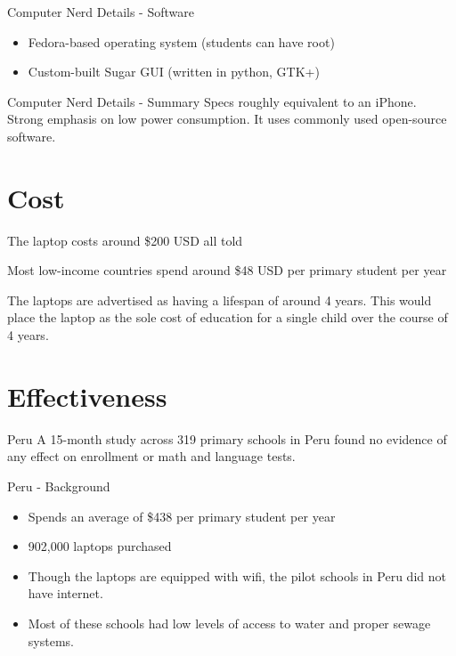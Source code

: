 \documentclass{beamer}
\begin{document}
\begin{frame}{Computer Nerd Details - Software}
\begin{itemize}
\item Fedora-based operating system (students can have root)
\item Custom-built Sugar GUI (written in python, GTK+) \cite{sugar}
\end{itemize}
\end{frame}

\begin{frame}{Computer Nerd Details - Summary}
Specs roughly equivalent to an iPhone. Strong emphasis on low power consumption. It uses commonly used open-source software.
\end{frame}

\section{Cost}

\begin{frame}[standout]
  The laptop costs around \$200 USD all told
\end{frame}

\begin{frame}[standout]
  Most low-income countries spend around \$48 USD per primary student per year
\end{frame}

\begin{frame}
  The laptops are advertised as having a lifespan of around 4 years. This would place the laptop as the sole cost of education for a single child over the course of 4 years.
\end{frame}

\section{Effectiveness}

\begin{frame}{Peru}
A 15-month study across 319 primary schools in Peru found \alert{no evidence} of any effect on enrollment or math and language tests. \cite{peru}
\end{frame}

\begin{frame}{Peru - Background}
\begin{itemize}
\item Spends an average of \$438 per primary student per year
\item 902,000 laptops purchased
\item Though the laptops are equipped with wifi, the pilot schools in Peru did not have internet.
\item Most of these schools had low levels of access to water and proper sewage systems.
\end{itemize}
\end{frame}
\end{document}
